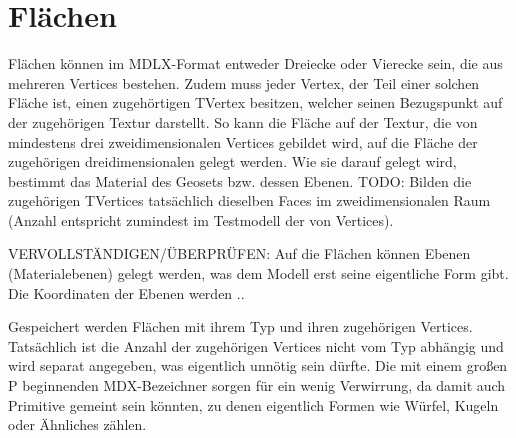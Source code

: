 \section{Flächen}
Flächen können im MDLX-Format entweder Dreiecke oder Vierecke sein, die aus mehreren Vertices bestehen.
Zudem muss jeder Vertex, der Teil einer solchen Fläche ist, einen zugehörtigen TVertex besitzen, welcher seinen Bezugspunkt
auf der zugehörigen Textur darstellt. So kann die Fläche auf der Textur, die von mindestens drei zweidimensionalen Vertices gebildet wird, auf die Fläche der zugehörigen dreidimensionalen gelegt werden.
Wie sie darauf gelegt wird, bestimmt das Material des Geosets bzw. dessen Ebenen.
TODO: Bilden die zugehörigen TVertices tatsächlich dieselben Faces im zweidimensionalen Raum (Anzahl entspricht zumindest im Testmodell der von Vertices).

VERVOLLSTÄNDIGEN/ÜBERPRÜFEN: Auf die Flächen können Ebenen (Materialebenen) gelegt werden, was dem Modell erst seine eigentliche Form gibt. Die Koordinaten der Ebenen werden ..

Gespeichert werden Flächen mit ihrem Typ und ihren zugehörigen Vertices.
Tatsächlich ist die Anzahl der zugehörigen Vertices nicht vom Typ abhängig und wird separat angegeben, was eigentlich unnötig sein dürfte.
Die mit einem großen P beginnenden MDX-Bezeichner sorgen für ein wenig Verwirrung, da damit auch Primitive gemeint sein könnten, zu denen eigentlich Formen wie Würfel, Kugeln oder Ähnliches zählen.
